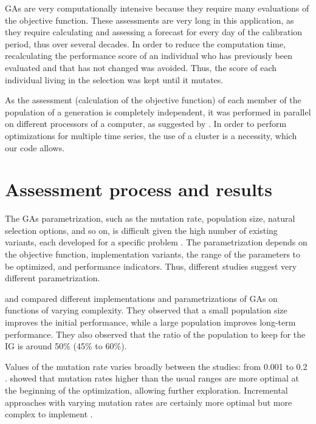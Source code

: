 \documentclass[twocol]{ametsoc}
\begin{document}
GAs are very computationally intensive because they require many evaluations of the objective function. These assessments are very long in this application, as they require calculating and assessing a forecast for every day of the calibration period, thus over several decades. In order to reduce the computation time, recalculating the performance score of an individual who has previously been evaluated and that has not changed was avoided. Thus, the score of each individual living in the selection was kept until it mutates.

As the assessment (calculation of the objective function) of each member of the population of a generation is completely independent, it was performed in parallel on different processors of a computer, as suggested by \citet{Alliot2005}. In order to perform optimizations for multiple time series, the use of a cluster is a necessity, which our code allows.


\section{Assessment process and results}
\label{sec:assessment}

The GAs parametrization, such as the mutation rate, population size, natural selection options, and so on, is difficult given the high number of existing variants, each developed for a specific problem \citep{Haupt2004, Costa2007a}. The parametrization depends on the objective function, implementation variants, the range of the parameters to be optimized, and performance indicators. Thus, different studies suggest very different parametrization.

\citet{DeJong1975a} and \citet{Grefenstette1986} compared different implementations and parametrizations of GAs on functions of varying complexity. They observed that a small population size improves the initial performance, while a large population improves long-term performance. They also observed that the ratio of the population to keep for the IG is around 50\% (45\% to 60\%).

Values of the mutation rate varies broadly between the studies: from 0.001 \citep{DeJong1975a} to 0.2 \citep{Haupt2004}. \citet{Back1996b} showed that mutation rates higher than the usual ranges are more optimal at the beginning of the optimization, allowing further exploration. Incremental approaches with varying mutation rates are certainly more optimal but more complex to implement \citep{Back1996a, Back1996b}.
\end{document}
